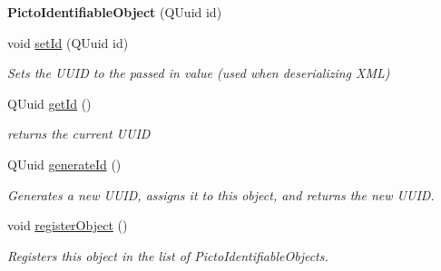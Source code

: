 \begin{DoxyCompactItemize}
\item 
\hypertarget{class_picto_1_1_picto_identifiable_object_a6594cb863bb522b9e6bcf482bb4f195e}{{\bfseries Picto\-Identifiable\-Object} (Q\-Uuid id)}\label{class_picto_1_1_picto_identifiable_object_a6594cb863bb522b9e6bcf482bb4f195e}

\item 
\hypertarget{class_picto_1_1_picto_identifiable_object_a499d0ad31e4aa41bba7ebb64e05e2593}{void \hyperlink{class_picto_1_1_picto_identifiable_object_a499d0ad31e4aa41bba7ebb64e05e2593}{set\-Id} (Q\-Uuid id)}\label{class_picto_1_1_picto_identifiable_object_a499d0ad31e4aa41bba7ebb64e05e2593}

\begin{DoxyCompactList}\small\item\em Sets the U\-U\-I\-D to the passed in value (used when deserializing X\-M\-L) \end{DoxyCompactList}\item 
\hypertarget{class_picto_1_1_picto_identifiable_object_acef6fda4b742c5083735155a393ae64e}{Q\-Uuid \hyperlink{class_picto_1_1_picto_identifiable_object_acef6fda4b742c5083735155a393ae64e}{get\-Id} ()}\label{class_picto_1_1_picto_identifiable_object_acef6fda4b742c5083735155a393ae64e}

\begin{DoxyCompactList}\small\item\em returns the current U\-U\-I\-D \end{DoxyCompactList}\item 
\hypertarget{class_picto_1_1_picto_identifiable_object_a09e54292ab7a5bf7624d4a56bf49bf32}{Q\-Uuid \hyperlink{class_picto_1_1_picto_identifiable_object_a09e54292ab7a5bf7624d4a56bf49bf32}{generate\-Id} ()}\label{class_picto_1_1_picto_identifiable_object_a09e54292ab7a5bf7624d4a56bf49bf32}

\begin{DoxyCompactList}\small\item\em Generates a new U\-U\-I\-D, assigns it to this object, and returns the new U\-U\-I\-D. \end{DoxyCompactList}\item 
\hypertarget{class_picto_1_1_picto_identifiable_object_ab66d3a8320bf63ae7d88d7db235cec46}{void \hyperlink{class_picto_1_1_picto_identifiable_object_ab66d3a8320bf63ae7d88d7db235cec46}{register\-Object} ()}\label{class_picto_1_1_picto_identifiable_object_ab66d3a8320bf63ae7d88d7db235cec46}

\begin{DoxyCompactList}\small\item\em Registers this object in the list of Picto\-Identifiable\-Objects. \end{DoxyCompactList}\end{DoxyCompactItemize}
